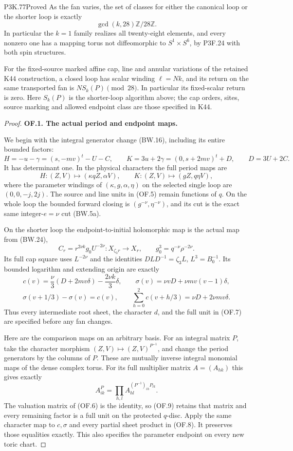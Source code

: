 \begin{statement}{P3K.77}{Proved}
As the fan varies, the set of classes for either the canonical
loop or the shorter loop is exactly
\[
                    \gcd(k,28)\mathbb Z/28\mathbb Z. \tag{OF.4}
\]
In particular the \(k=1\) family realizes all twenty-eight
elements, and every nonzero one has a mapping torus not
diffeomorphic to \(S^1\times S^6\), by P3F.24 with both spin
structures.

For the fixed-source marked affine cap, line and annular
variations of the retained K44 construction, a closed loop
has scalar winding \(\ell=Nk\), and its return on the
same transported fan is \(N S_k(P)\pmod {28}\).
In particular its fixed-scalar return is zero. Here
\(S_k(P)\) is the shorter-loop algorithm above; the
cap orders, sites, source marking and allowed endpoint
class are those specified in K44.
\end{statement}
\begin{proof}
\par\medskip\noindent\textbf{OF.1. The actual period and endpoint maps.}\par\nopagebreak[4]
We begin with the integral generator change (BW.16), including
its entire bounded factors:
\[
 H=-u-\gamma=(s,-mv)^t-U-C,\qquad
 K=3u+2\gamma=(0,s+2mv)^t+D,\qquad D=3U+2C.
 \tag{OF.5}
\]
It has determinant one. In the physical characters the full
period maps are
\[
 H:(Z,V)\longmapsto(\kappa qZ,\alpha V),\qquad
 K:(Z,V)\longmapsto(gZ,q\eta V),
 \tag{OF.6}
\]
where the parameter windings of \((\kappa,g,\alpha,\eta)\)
on the selected single loop are \((0,0,-j,2j)\).
The source and line units in (OF.5) remain functions of \(q\).
On the whole loop the bounded forward closing is
\((g^{-\nu},\eta^{-\nu})\), and its cut is the exact same
integer-\(e=\nu\) cut (BW.5a).

On the shorter loop the endpoint-to-initial holomorphic map is
the actual map from (BW.24),
\[
 C_r=r^{2\nu k}g_0U^{-2\nu}:X_{\zeta_3r}\longrightarrow X_r,
 \qquad g_0^3=q^{-\nu}\rho^{-2\nu}.
 \tag{OF.7}
\]
Its full cap square uses \(L^{-2\nu}\) and the identities
\(DLD^{-1}=\zeta_3L\), \(L^3=B_0^{-1}\). Its bounded logarithm
and extending origin are exactly
\[
 c(v)=\frac\nu3(D+2mv\delta)-\frac{2\nu k}{3}\delta,
 \qquad \sigma(v)=\nu vD+\nu mv(v-1)\delta,
\]
\[
 \sigma(v+1/3)-\sigma(v)=c(v),\qquad
 \sum_{h=0}^2c(v+h/3)=\nu D+2\nu mv\delta.            \tag{OF.8}
\]
Thus every intermediate root sheet, the character \(d\), and
the full unit in (OF.7) are specified before any fan changes.

Here are the comparison maps on an arbitrary basis. For an
integral matrix \(P\), take the character morphism
\((Z,V)\mapsto (Z,V)^{P^{-1}}\), and change the period generators
by the columns of \(P\). These are mutually inverse integral
monomial maps of the dense complex torus. For its full multiplier
matrix \(A=(A_{hk})\) this gives exactly
\[
 A^P_{ik}=\prod_{h,l}A_{hl}^{(P^{-1})_{ih}P_{lk}}.
 \tag{OF.9}
\]
The valuation matrix of (OF.6) is the identity, so (OF.9)
retains that matrix and every remaining factor is a full unit
on the protected \(q\)-disc. Apply the same character map to
\(c,\sigma\) and every partial sheet product in (OF.8).
It preserves those equalities exactly. This also specifies
the parameter endpoint on every new toric chart.


\end{proof}
